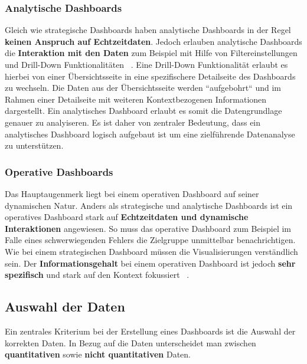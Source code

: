 \subsubsection{Analytische Dashboards}
Gleich wie strategische Dashboards haben analytische Dashboards in der Regel \textbf{keinen Anspruch auf Echtzeitdaten}. Jedoch erlauben analytische Dashboards die \textbf{Interaktion mit den Daten} zum Beispiel mit Hilfe von Filtereinstellungen und Drill-Down Funktionalitäten ~\citep[S. 41]{information_dashboard_design}. Eine Drill-Down Funktionalität erlaubt es hierbei von einer Übersichtsseite in eine spezifischere Detailseite des Dashboards zu wechseln. Die Daten aus der Übersichtsseite werden ``aufgebohrt`` und im Rahmen einer Detailseite mit weiteren Kontextbezogenen Informationen dargestellt. Ein analytisches Dashboard erlaubt es somit die Datengrundlage genauer zu analyiseren. Es ist daher von zentraler Bedeutung, dass ein analytisches Dashboard logisch aufgebaut ist um eine zielführende Datenanalyse zu unterstützen.

\subsubsection{Operative Dashboards}
Das Hauptaugenmerk liegt bei einem operativen Dashboard auf seiner dynamischen Natur. Anders als strategische und analytische Dashboards ist ein operatives Dashboard stark auf \textbf{Echtzeitdaten und dynamische Interaktionen} angewiesen. So muss das operative Dashboard zum Beispiel im Falle eines schwerwiegenden Fehlers die Zielgruppe unmittelbar benachrichtigen. Wie bei einem strategischen Dashboard müssen die Visualisierungen verständlich sein. Der \textbf{Informationsgehalt} bei einem operativen Dashboard ist jedoch \textbf{sehr spezifisch} und stark auf den Kontext fokussiert ~\citep[S. 42]{information_dashboard_design}.

\subsection{Auswahl der Daten}
Ein zentrales Kriterium bei der Erstellung eines Dashboards ist die Auswahl der korrekten Daten. In Bezug auf die Daten unterscheidet man zwischen \textbf{quantitativen} sowie \textbf{nicht quantitativen} Daten.

